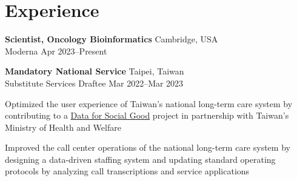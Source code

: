 \section{Experience}

\begin{entrylist}

\item \textbf{Scientist, Oncology Bioinformatics} \hfill Cambridge, USA\\
    Moderna \hfill
    Apr 2023--Present

\item \textbf{Mandatory National Service} \hfill Taipei, Taiwan\\
Substitute Services Draftee \hfill
Mar 2022--Mar 2023
\begin{detaillist}
    \item Optimized the user experience of Taiwan's national long-term care system by contributing to a \href{https://d4sg.org/}{Data for Social Good} project in partnership with Taiwan's Ministry of Health and Welfare
    \item Improved the call center operations of the national long-term care system by designing a data-driven staffing system and updating standard operating protocols by analyzing call transcriptions and service applications
\end{detaillist}


\end{entrylist}

